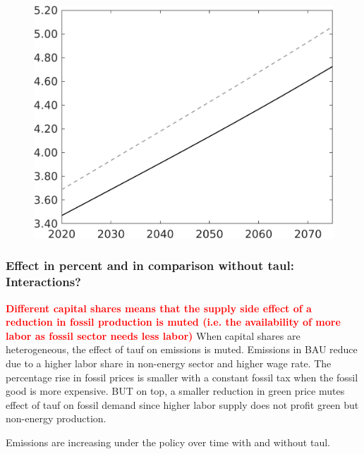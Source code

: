 \documentclass[12pt]{article}
\newcommand{\tr}[1]{\textcolor{red}{#1}}
\begin{document}
\begin{figure}[h!!]
\begin{minipage}[]{0.32\textwidth}
	\end{minipage}	
	\begin{minipage}[]{0.32\textwidth}
		\includegraphics[width=1\textwidth]{../../codding_model/own_basedOnFried/optimalPol_010922_revision/figures/all_13Sept22/LevTaufNoTauf_TaulCalib_regime0_wh_spillover0_nsk1_xgr1_knspil1_sep1_LFlimit0_emsbase0_countec0_GovRev0_etaa0.79_lgd0.png}
	\end{minipage}	
\end{figure}

\subsubsection{Effect in percent and in comparison without taul: Interactions?}
\tr{\textbf{Different capital shares means that the supply side effect of a reduction in fossil production is muted (i.e. the availability of more labor as fossil sector needs less labor)}}
When capital shares are heterogeneous, the effect of tauf on emissions is muted. Emissions in BAU reduce due to a higher labor share in non-energy sector and higher wage rate. The percentage rise in fossil prices is smaller with a constant fossil tax when the fossil good is more expensive. BUT on top, a smaller reduction in green price mutes effect of tauf on fossil demand since higher labor supply does not profit green but non-energy production. 
 
 Emissions are increasing under the policy over time with and without taul.
\end{document}
